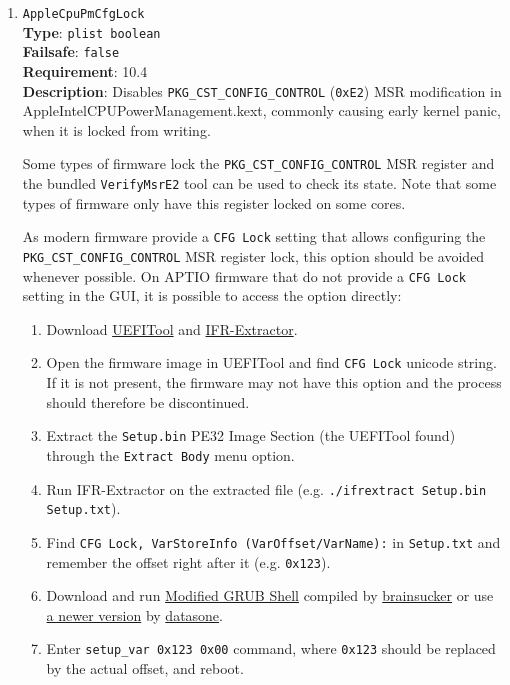 \documentclass[]{article}
\providecommand{\tightlist}{%
  \setlength{\itemsep}{0pt}\setlength{\parskip}{0pt}}
\begin{document}
\begin{enumerate}

\item
  \texttt{AppleCpuPmCfgLock}\\
  \textbf{Type}: \texttt{plist\ boolean}\\
  \textbf{Failsafe}: \texttt{false}\\
  \textbf{Requirement}: 10.4\\
  \textbf{Description}: Disables \texttt{PKG\_CST\_CONFIG\_CONTROL} (\texttt{0xE2})
  MSR modification in AppleIntelCPUPowerManagement.kext, commonly causing early
  kernel panic, when it is locked from writing.

  Some types of firmware lock the \texttt{PKG\_CST\_CONFIG\_CONTROL} MSR register and the bundled
  \texttt{VerifyMsrE2} tool can be used to check its state. Note that some types of firmware only
  have this register locked on some cores.

  As modern firmware provide a \texttt{CFG Lock} setting that allows configuring the
  \texttt{PKG\_CST\_CONFIG\_CONTROL} MSR register lock, this option should be avoided
  whenever possible. On APTIO firmware that do not provide a \texttt{CFG Lock}
  setting in the GUI, it is possible to access the option directly:

  \begin{enumerate}
    \tightlist
    \item Download \href{https://github.com/LongSoft/UEFITool/releases}{UEFITool} and
      \href{https://github.com/LongSoft/Universal-IFR-Extractor/releases}{IFR-Extractor}.
    \item Open the firmware image in UEFITool and find \texttt{CFG Lock} unicode string.
      If it is not present, the firmware may not have this option and the process should therefore be discontinued.
    \item Extract the \texttt{Setup.bin} PE32 Image Section (the UEFITool found) through the
      \texttt{Extract Body} menu option.
    \item Run IFR-Extractor on the extracted file (e.g. \texttt{./ifrextract Setup.bin Setup.txt}).
    \item Find \texttt{CFG Lock, VarStoreInfo (VarOffset/VarName):} in \texttt{Setup.txt} and
      remember the offset right after it (e.g. \texttt{0x123}).
    \item Download and run \href{http://brains.by/posts/bootx64.7z}{Modified GRUB Shell} compiled by
      \href{https://geektimes.com/post/258090}{brainsucker} or use
      \href{https://github.com/datasone/grub-mod-setup_var}{a newer version} by
      \href{https://github.com/datasone}{datasone}.
    \item Enter \texttt{setup\_var 0x123 0x00} command, where \texttt{0x123} should be replaced by
      the actual offset, and reboot.
  \end{enumerate}


\end{enumerate}
\end{document}
